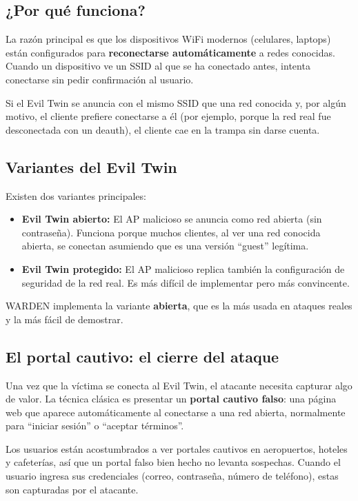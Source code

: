 \documentclass[11pt,a4paper]{article}
\begin{document}
\subsection{¿Por qué funciona?}
La razón principal es que los dispositivos WiFi modernos (celulares,
laptops) están configurados para \textbf{reconectarse automáticamente} a
redes conocidas. Cuando un dispositivo ve un SSID al que se ha conectado
antes, intenta conectarse sin pedir confirmación al usuario.

Si el Evil Twin se anuncia con el mismo SSID que una red conocida y, por
algún motivo, el cliente prefiere conectarse a él (por ejemplo, porque la
red real fue desconectada con un deauth), el cliente cae en la trampa sin
darse cuenta.

\subsection{Variantes del Evil Twin}
Existen dos variantes principales:

\begin{itemize}
  \item \textbf{Evil Twin abierto:} El AP malicioso se anuncia como red
    abierta (sin contraseña). Funciona porque muchos clientes, al ver una
    red conocida abierta, se conectan asumiendo que es una versión ``guest''
    legítima.
  \item \textbf{Evil Twin protegido:} El AP malicioso replica también la
    configuración de seguridad de la red real. Es más difícil de
    implementar pero más convincente.
\end{itemize}

WARDEN implementa la variante \textbf{abierta}, que es la más usada en
ataques reales y la más fácil de demostrar.

\subsection{El portal cautivo: el cierre del ataque}
Una vez que la víctima se conecta al Evil Twin, el atacante necesita
capturar algo de valor. La técnica clásica es presentar un \textbf{portal
cautivo falso}: una página web que aparece automáticamente al conectarse
a una red abierta, normalmente para ``iniciar sesión'' o ``aceptar términos''.

Los usuarios están acostumbrados a ver portales cautivos en aeropuertos,
hoteles y cafeterías, así que un portal falso bien hecho no levanta
sospechas. Cuando el usuario ingresa sus credenciales (correo,
contraseña, número de teléfono), estas son capturadas por el atacante.
\end{document}
